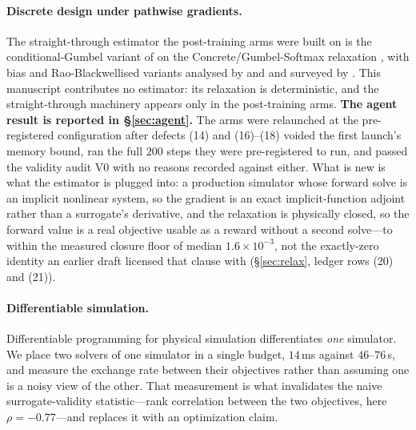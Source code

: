 \documentclass{article}
\begin{document}
\paragraph{Discrete design under pathwise gradients.}
The straight-through estimator the post-training arms were built on is the
conditional-Gumbel variant of \citet{kool2019stochastic} on the Concrete/Gumbel-Softmax
relaxation \citep{maddison2017concrete,jang2017categorical}, with bias and
Rao-Blackwellised variants analysed by \citet{paulus2021rao} and
\citet{shekhovtsov2023cold} and surveyed by \citet{huijben2023review}.  This manuscript
contributes no estimator: its relaxation is deterministic, and the straight-through
machinery appears only in the post-training arms.  \textbf{The agent result is reported
in \S\ref{sec:agent}.}  The arms were relaunched at the
pre-registered configuration after defects (14) and (16)--(18) voided the first launch's
memory bound, ran the full $200$ steps they were pre-registered to run, and passed the
validity audit V0 with no reasons recorded against either.  What is new is what the estimator
is plugged into: a production simulator whose forward solve is an implicit nonlinear
system, so the gradient is an exact implicit-function adjoint rather than a surrogate's
derivative, and the relaxation is physically closed, so the forward value is a real
objective usable as a reward without a second solve---to within the measured closure
floor of median $1.6\times10^{-3}$, not the exactly-zero identity an earlier draft
licensed that clause with (\S\ref{sec:relax}, ledger rows (20) and (21)).

\paragraph{Differentiable simulation.}
Differentiable programming for physical simulation
\citep{hu2020difftaichi,fan2026diffflowfsi} differentiates \emph{one} simulator.  We
place two solvers of one simulator in a single budget, $14$\,ms against
$46$--$76$\,s, and measure the exchange rate between their objectives rather than assuming
one is a noisy view of the other.  That measurement is what invalidates the naive
surrogate-validity statistic---rank correlation between the two objectives, here
$\rho = -0.77$---and replaces it with an optimization claim.
\end{document}

